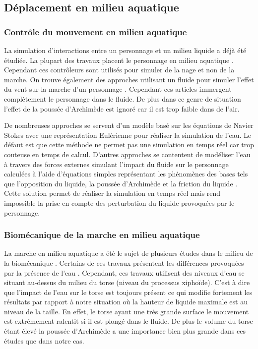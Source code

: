 \documentclass[runningheads,a4paper]{llncs}
\begin{document}
\subsection{Déplacement en milieu aquatique}
\subsubsection{Contrôle du mouvement en milieu aquatique}
La simulation d'interactions entre un personnage et un milieu liquide a déjà été étudiée. La plupart des travaux placent le personnage en milieu aquatique \cite{yang2004layered,kwatra2010fluid,tan2011articulated,si2014realistic}. Cependant ces contrôleurs sont utilisés pour simuler de la nage et non de la marche. On trouve également des approches utilisant un fluide pour simuler l'effet du vent sur la marche d'un personnage \cite{lentine2011creature}. Cependant ces articles immergent complètement le personnage dans le fluide. De plus dans ce genre de situation l'effet de la poussée d'Archimède est ignoré car il est trop faible dans de l'air.

De nombreuses approches se servent d'un modèle basé sur les équations de Navier Stokes \cite{stam1999stable} avec une représentation Eulérienne \cite{si2014realistic} pour réaliser la simulation de l'eau. Le défaut est que cette méthode ne permet pas une simulation en temps réel car trop couteuse en temps de calcul. D'autres approches se contentent de modéliser l'eau à travers des forces externes simulant l'impact du fluide sur le personnage calculées à l'aide d'équations simples représentant les phénomènes des bases tels que l'opposition du liquide, la poussée d'Archimède et la friction du liquide \cite{yang2004layered}. Cette solution permet de réaliser la simulation en temps réel mais rend impossible la prise en compte des perturbation du liquide provoquées par le personnage.

\subsubsection{Biomécanique de la marche en milieu aquatique}
La marche en milieu aquatique a été le sujet de plusieurs études dans le milieu de la biomécanique \cite{barela2006biomechanical,chevutschi2009comparison,orselli2011joint,miyoshi2005functional}. Certains de ces travaux présentent les différences provoquées par la présence de l'eau \cite{barela2006biomechanical}. Cependant, ces travaux utilisent des niveaux d'eau se situant au-dessus du milieu du torse (niveau du processus xiphoïde). C’est à dire que l'impact de l'eau sur le torse est toujours présent ce qui modifie fortement les résultats par rapport à notre situation où la hauteur de liquide maximale est au niveau de la taille. En effet, le torse ayant une très grande surface le mouvement est extrêmement ralentit si il est plongé dans le fluide. De plus le volume du torse étant élevé la poussée d'Archimède a une importance bien plus grande dans ces études que dans notre cas. 
\end{document}
